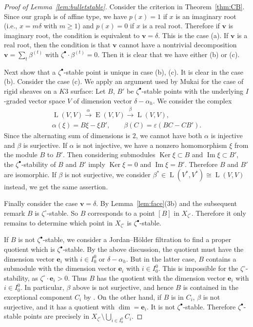 \documentclass[10pt,a4paper]{amsart}
\theoremstyle{definition}
\numberwithin{equation}{section}
\newcommand{\thmref}[1]{Theorem~\ref{#1}}
\newcommand{\lemref}[1]{Lemma~\ref{#1}}
\newcommand{\Ker}{\operatorname{Ker}}
\newcommand{\Ima}{\operatorname{Im}}
\newcommand{\bv}{{\mathbf v}} %
\newcommand{\be}{{\mathbf e}}
\newcommand{\HomE}{\operatorname{E}}
\newcommand{\HomL}{\operatorname{L}}
\begin{document}
\begin{proof}[Proof of \lemref{lem:bulletstable}]
  Consider the criterion in \thmref{thm:CB}. Since our graph is of
  af\/f\/ine type, we have $p(x) = 1$ if $x$ is an imaginary root (i.e.,
  $x = m\delta$ with $m\ge 1$) and $p(x) = 0$ if $x$ is a real root.
  Therefore if $\bv$ is imaginary root, the condition is equivalent to
  $\bv = \delta$. This is the case (a). If $\bv$ is a real root, then
  the condition is that $\bv$ cannot have a nontrivial decomposition
  $\bv = \sum_t \beta^{(t)}$ with $\zeta^\bullet\cdot \beta^{(t)} = 0$. Then
  it is clear that we have either (b) or (c).


Next show that a $\zeta^\bullet$-stable point is unique in case (b),
(c). It is clear in the case (b). Consider the case (c). We apply an
argument used by Mukai for the case of rigid sheaves on a $K3$
surface:
%
Let $B$, $B'$ be $\zeta^\bullet$-stable points with the underlying
$I$-graded vector space $V$ of dimension vector $\delta-\alpha_h$. We
consider the complex
\begin{gather*}
  \HomL(V,V) \xrightarrow{\alpha} \HomE(V,V) \xrightarrow{\beta}
  \HomL(V,V),
\\
  \alpha(\xi) = B\xi - \xi B', \qquad
  \beta(C) = \varepsilon (B C - C B').
\end{gather*}
Since the alternating sum of dimensions is $2$, we cannot have both
$\alpha$ is injective and $\beta$ is surjective. If $\alpha$ is not
injective, we have a nonzero homomorphism $\xi$ from the module $B$ to
$B'$. Then considering submodules $\Ker\xi\subset B$ and
$\Ima\xi\subset B'$, the $\zeta^\bullet$-stability of $B$ and $B'$
imply $\Ker\xi = 0$ and $\Ima\xi = B'$. Therefore $B$ and $B'$ are
isomorphic. If $\beta$ is not surjective, we consider
$\beta^*\in \HomL(V^*,V^*) \cong \HomL(V,V)$ instead, we get the same
assertion.

Finally consider the case $\bv = \delta$.
%
By \lemref{lem:face}(3b) and the subsequent remark $B$ is
$\zeta^\circ$-stable. So $B$ corresponds to a point $[B]$ in
$X_{\zeta^\circ}$. Therefore it only remains to determine which point
in $X_{\zeta^\circ}$ is $\zeta^\bullet$-stable.

If $B$ is not $\zeta^\bullet$-stable, we consider a
Jordan--H\"older f\/iltration to f\/ind a proper quotient which is
$\zeta^\bullet$-stable. By the above discussion, the quotient must
have the dimension vector $\be_i$ with $i\in I_0^0$ or
$\delta-\alpha_h$. But in the latter case, $B$ contains a submodule
with the dimension vector $\be_i$ with $i\in I_0^0$. This is
impossible for the $\zeta^\circ$-stability, as $\zeta^\circ \cdot
\be_i > 0$.
%
Thus $B$ has the quotient with the dimension vector $\be_i$ with
$i\in I_0^0$. In particular, $\beta$ above is not surjective, and
hence $B$ is contained in the exceptional component $C_i$ by
\cite[Proof of 5.10]{Na-proc}.
%
On the other hand, if $B$ is in $C_i$, $\beta$ is not surjective,
and it has a quotient with $\dim = \be_i$. It is not
$\zeta^\bullet$-stable.
%
Therefore $\zeta^\bullet$-stable points are precisely in
$X_{\zeta^\circ}\setminus \bigcup_{i\in I_0^0} C_i$.
\end{proof}
\end{document}
